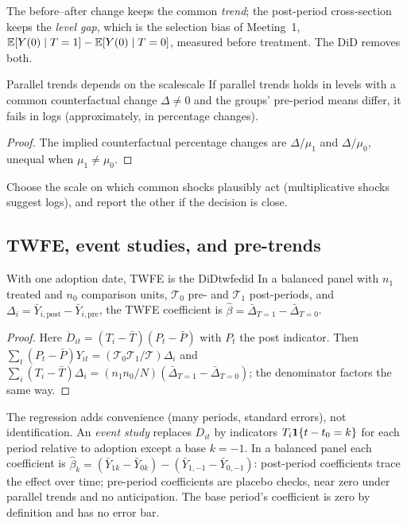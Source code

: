 \documentclass[11pt]{article}
\begin{document}
The before--after change keeps the common \emph{trend}; the post-period cross-section keeps the \emph{level gap}, which is the selection bias of
Meeting~1, $\mathbb{E}[Y(0) \mid T=1] - \mathbb{E}[Y(0) \mid T=0]$, measured before treatment. The DiD removes both.

\begin{prop}{Parallel trends depends on the scale}{scale}
If parallel trends holds in levels with a common counterfactual change $\Delta \ne 0$ and the groups' pre-period means differ, it fails in
logs (approximately, in percentage changes).
\end{prop}
\begin{proof}
The implied counterfactual percentage changes are $\Delta/\mu_1$ and $\Delta/\mu_0$, unequal when $\mu_1 \ne \mu_0$.
\end{proof}
Choose the scale on which common shocks plausibly act (multiplicative shocks suggest logs), and report the other if the decision is close.

\subsection{TWFE, event studies, and pre-trends}

\begin{prop}{With one adoption date, TWFE is the DiD}{twfedid}
In a balanced panel with $n_1$ treated and $n_0$ comparison units, $\mathcal T_0$ pre- and $\mathcal T_1$ post-periods, and
$\Delta_i = \bar Y_{i,\text{post}} - \bar Y_{i,\text{pre}}$, the TWFE coefficient is $\hat\beta = \bar\Delta_{T=1} - \bar\Delta_{T=0}$.
\end{prop}
\begin{proof}
Here $\ddot D_{it} = (T_i - \bar T)(P_t - \bar P)$ with $P_t$ the post indicator. Then $\sum_t(P_t - \bar P)Y_{it} = (\mathcal T_0\mathcal T_1/\mathcal T)\Delta_i$ and
$\sum_i(T_i - \bar T)\Delta_i = (n_1n_0/N)(\bar\Delta_{T=1} - \bar\Delta_{T=0})$; the denominator factors the same way.
\end{proof}

The regression adds convenience (many periods, standard errors), not identification. An \emph{event study} replaces $D_{it}$ by indicators
$T_i\mathbf{1}\{t - t_0 = k\}$ for each period relative to adoption except a base $k = -1$. In a balanced panel each coefficient is
$\hat\beta_k = (\bar Y_{1k} - \bar Y_{0k}) - (\bar Y_{1,-1} - \bar Y_{0,-1})$: post-period coefficients trace the effect over time; pre-period
coefficients are placebo checks, near zero under parallel trends and no anticipation. The base period's coefficient is zero by definition and
has no error bar.
\end{document}
